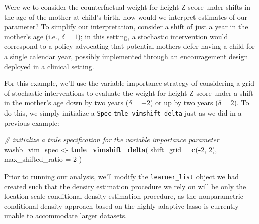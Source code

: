 \documentclass[12pt, krantz2,]{krantz}
\newenvironment{Shaded}{\begin{snugshade}}{\end{snugshade}}
\newcommand{\CommentTok}[1]{\textcolor[rgb]{0.37,0.37,0.37}{\textit{#1}}}
\newcommand{\DataTypeTok}[1]{\textcolor[rgb]{0.27,0.27,0.27}{#1}}
\newcommand{\DecValTok}[1]{\textcolor[rgb]{0.06,0.06,0.06}{#1}}
\newcommand{\KeywordTok}[1]{\textcolor[rgb]{0.27,0.27,0.27}{\textbf{#1}}}
\newcommand{\NormalTok}[1]{#1}
\newcommand{\OperatorTok}[1]{\textcolor[rgb]{0.43,0.43,0.43}{\textbf{#1}}}
\newcommand{\OtherTok}[1]{\textcolor[rgb]{0.37,0.37,0.37}{#1}}
\newcommand{\StringTok}[1]{\textcolor[rgb]{0.5,0.5,0.5}{#1}}
\theoremstyle{definition}
\theoremstyle{definition}
\theoremstyle{definition}
\newcommand{\1}{\mathbbm{1}}
\begin{document}
Were we to consider the counterfactual weight-for-height Z-score under shifts in
the age of the mother at child's birth, how would we interpret estimates of our
parameter? To simplify our interpretation, consider a shift of just a year in
the mother's age (i.e., \(\delta = 1\)); in this setting, a stochastic
intervention would correspond to a policy advocating that potential mothers
defer having a child for a single calendar year, possibly implemented through an
encouragement design deployed in a clinical setting.

For this example, we'll use the variable importance strategy of considering a
grid of stochastic interventions to evaluate the weight-for-height Z-score under
a shift in the mother's age down by two years (\(\delta = -2\)) or up by two years
(\(\delta = 2\)). To do this, we simply initialize a \texttt{Spec} \texttt{tmle\_vimshift\_delta}
just as we did in a previous example:

\begin{Shaded}
\begin{Highlighting}[]
\CommentTok{# initialize a tmle specification for the variable importance parameter}
\NormalTok{washb_vim_spec <-}\StringTok{ }\KeywordTok{tmle_vimshift_delta}\NormalTok{(}
  \DataTypeTok{shift_grid =} \KeywordTok{c}\NormalTok{(}\OperatorTok{-}\DecValTok{2}\NormalTok{, }\DecValTok{2}\NormalTok{),}
  \DataTypeTok{max_shifted_ratio =} \DecValTok{2}
\NormalTok{)}
\end{Highlighting}
\end{Shaded}

Prior to running our analysis, we'll modify the \texttt{learner\_list} object we had
created such that the density estimation procedure we rely on will be only the
location-scale conditional density estimation procedure, as the nonparametric
conditional density approach based on the highly adaptive lasso \citep{diaz2011super, benkeser2016hal, coyle2020hal9001, hejazi2020hal9001, hejazi2020haldensify}
is currently unable to accommodate larger datasets.

\begin{Shaded}
\end{Shaded}
\end{document}
